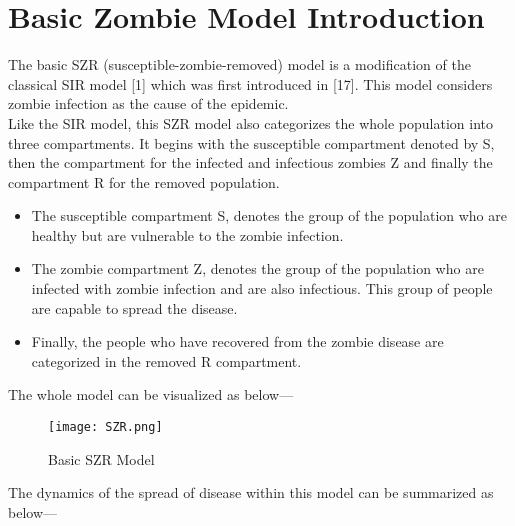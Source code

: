 \section{Basic Zombie Model Introduction}

The basic SZR (susceptible-zombie-removed) model is a modification of the classical SIR model [1] which was first introduced in [17]. This model considers zombie infection as the cause of the epidemic. \\

Like the SIR model, this SZR model also categorizes the whole population into three compartments. It begins with the susceptible compartment denoted by S, then the compartment for the infected and infectious zombies Z and finally the compartment R for the removed population. \\

\begin{itemize}
	\item The susceptible compartment S, denotes the group of the population who are healthy but are vulnerable to the zombie infection. \\
	
	\item The zombie compartment Z, denotes the group of the population who are infected with zombie infection and are also infectious. This group of people are capable to spread the disease.\\
	
	\item Finally, the people who have recovered from the zombie disease are categorized in the removed R compartment.
\end{itemize}

The whole model can be visualized as below--- \\

\begin{figure}[H]
\centering
\texttt{[image: SZR.png]}
\caption{Basic SZR Model}
\label{fig:Basic SZR Model}
\end{figure}

The dynamics of the spread of disease within this model can be summarized as below--- 

